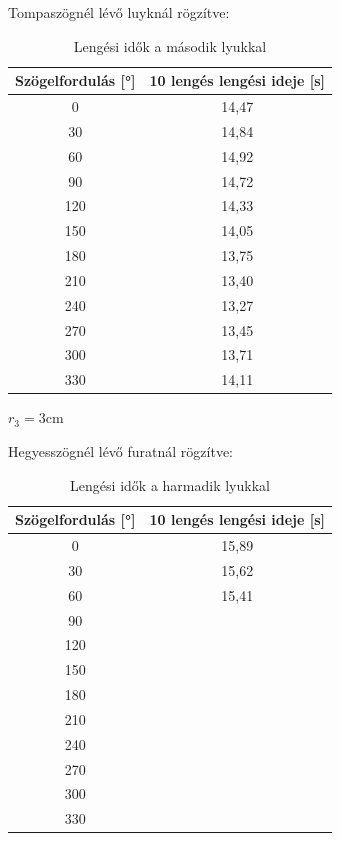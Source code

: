 \documentclass{article}
\begin{document}
Tompaszögnél lévő luyknál rögzítve:

\begin{table}[H]
    \centering
    \begin{tabular}{|c|c|}
        \hline
        Szögelfordulás [°] & 10 lengés lengési ideje [s] \\ \hline
         0 & 14,47 \\ \hline 
         30 & 14,84 \\ \hline
         60 & 14,92 \\ \hline 
         90 & 14,72 \\ \hline
         120 & 14,33 \\ \hline 
         150 & 14,05 \\ \hline
         180 & 13,75 \\ \hline
         210 & 13,40 \\ \hline
         240 & 13,27 \\ \hline
         270 & 13,45 \\ \hline
         300 & 13,71 \\ \hline
         330 & 14,11\\ \hline
        
    \end{tabular}
    \caption{Lengési idők a második lyukkal}
    \label{tab:lengesiido_2.2}
\end{table}

$r_{3}= 3 \text{cm}$

Hegyesszögnél lévő furatnál rögzítve:

\begin{table}[H]
    \centering
    \begin{tabular}{|c|c|}
        \hline
        Szögelfordulás [°] & 10 lengés lengési ideje [s] \\ \hline
         0 & 15,89 \\ \hline 
         30 & 15,62 \\ \hline
         60 & 15,41 \\ \hline 
         90 &  \\ \hline
         120 &  \\ \hline 
         150 &  \\ \hline
         180 &  \\ \hline
         210 &  \\ \hline
         240 &  \\ \hline
         270 &  \\ \hline
         300 &  \\ \hline
         330 &  \\ \hline
        
    \end{tabular}
    \caption{Lengési idők a harmadik lyukkal}
    \label{tab:lengesiido_3.1}
\end{table}
\end{document}
